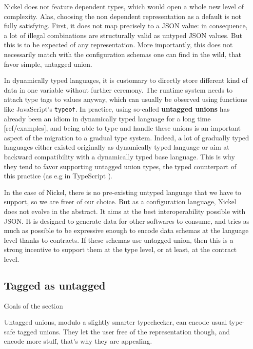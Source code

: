 \documentclass{article}
\begin{document}
Nickel does not feature dependent types, which would open a whole new level of
complexity. Alas, choosing the non dependent representation as a default is not
fully satisfying.  First, it does not map precisely to a JSON value: in
consequence, a lot of illegal combinations are structurally valid as untyped
JSON values. But this is to be expected of any representation. More importantly,
this does not necessarily match with the configuration schemas one can find in
the wild, that favor simple, untagged union.

In dynamically typed languages, it is customary to directly store different kind
of data in one variable without further ceremony. The runtime system needs to
attach type tags to values anyway, which can usually be observed using functions
like JavaScript's \verb+typeof+. In practice, using so-called \textbf{untagged
unions} has already been an idiom in dynamically typed language for a long time
[ref/examples], and being able to type and handle these unions is an important
aspect of the migration to a gradual type system. Indeed, a lot of gradually
typed languages either existed originally as dynamically typed language or aim
at backward compatibility with a dynamically typed base language. This is why
they tend to favor supporting untagged union types, the typed counterpart of
this practice (as e.g in TypeScript \cite{TypeScriptUnions}).

In the case of Nickel, there is no pre-existing untyped language that we have to
support, so we are freer of our choice. But as a configuration language, Nickel
does not evolve in the abstract. It aims at the best interoperability possible
with JSON. It is designed to generate data for other softwares to consume, and
tries as much as possible to be expressive enough to encode data schemas at the
language level thanks to contracts. If these schemas use untagged union, then
this is a strong incentive to support them at the type level, or at least, at
the contract level.

\subsection{Tagged as untagged}
\color{red}Goals of the section

Untagged unions, modulo a slightly smarter typechecker, can encode usual type-safe
tagged unions. They let the user free of the representation though, and encode
more stuff, that's why they are appealing.\vspace{0.5cm}\color{black}
\end{document}
